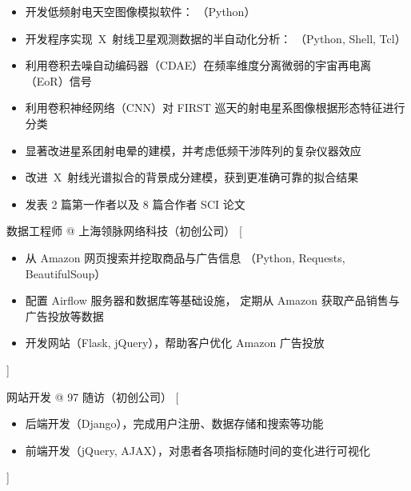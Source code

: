 \documentclass[zh]{resume}
\begin{document}
\begin{itemize}
  \item 开发低频射电天空图像模拟软件：
    （Python）
  \item 开发程序实现~X~射线卫星观测数据的半自动化分析：
    （Python, Shell, Tcl）
  \item 利用卷积去噪自动编码器（CDAE）在频率维度分离微弱的宇宙再电离（EoR）信号
  \item 利用卷积神经网络（CNN）对 FIRST 巡天的射电星系图像根据形态特征进行分类
  \item 显著改进星系团射电晕的建模，并考虑低频干涉阵列的复杂仪器效应
  \item 改进~X~射线光谱拟合的背景成分建模，获到更准确可靠的拟合结果
  \item 发表 2 篇第一作者以及 8 篇合作者 SCI 论文
\end{itemize}

\begin{experiences}
    {数据工程师 @ 上海领脉网络科技（初创公司）}%
    [\begin{itemize}
      \item 从 Amazon 网页搜索并挖取商品与广告信息
        （Python, Requests, BeautifulSoup）
      \item 配置 Airflow 服务器和数据库等基础设施，
        定期从 Amazon 获取产品销售与广告投放等数据
      \item 开发网站（Flask, jQuery），帮助客户优化 Amazon 广告投放
    \end{itemize}]

  \separator{0.5ex}
    {网站开发 @ 97 随访（初创公司）}%
    [\begin{itemize}
      \item 后端开发（Django），完成用户注册、数据存储和搜索等功能
      \item 前端开发（jQuery, AJAX），对患者各项指标随时间的变化进行可视化
    \end{itemize}]
\end{experiences}
\end{document}
